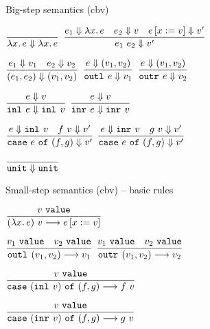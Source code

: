 \documentclass{beamer}
\begin{document}
\begin{frame}{Big-step semantics (cbv)}

\begin{center}
  $\infrule{}{\bigstep{\fun{x}{e}}{\fun{x}{e}}}$ \quad
  $\infrule{\bigstep{e_1}{\fun{x}{e}} \quad \bigstep{e_2}{v} \quad \bigstep{\subst{e}{x}{v}}{v'}}{\bigstep{\app{e_1}{e_2}}{v'}}$

  \vspace{2em}

  $\displaystyle \frac{e_1 \Downarrow v_1 \quad e_2 \Downarrow v_2}{(e_1, e_2) \Downarrow (v_1, v_2)} \textsc{\footnotesize{}}$ \quad
  $\displaystyle \frac{e \Downarrow (v_1, v_2)}{\texttt{outl}_{}\ e \Downarrow v_1} \textsc{\footnotesize{}}$ \quad
  $\displaystyle \frac{e \Downarrow (v_1, v_2)}{\texttt{outr}_{}\ e \Downarrow v_2} \textsc{\footnotesize{}}$ \quad

  \vspace{2em}

  $\displaystyle \frac{e \Downarrow v}{\texttt{inl}_{}\ e \Downarrow \texttt{inl}_{}\ v} \textsc{\footnotesize{}}$ \quad
  $\displaystyle \frac{e \Downarrow v}{\texttt{inr}_{}\ e \Downarrow \texttt{inr}_{}\ v} \textsc{\footnotesize{}}$ \quad

  \vspace{2em}

  $\infrule{\bigstep{e}{\inl{v}} \quad \bigstep{\app{f}{v}}{v'}}{\bigstep{\case{e}{f}{g}}{v'}}$ \quad
  $\infrule{\bigstep{e}{\inr{v}} \quad \bigstep{\app{g}{v}}{v'}}{\bigstep{\case{e}{f}{g}}{v'}}$

  \vspace{2em}

  $\displaystyle \frac{}{\texttt{unit} \Downarrow \texttt{unit}} \textsc{\footnotesize{}}$ \quad
\end{center}

\end{frame}

\begin{frame}{Small-step semantics (cbv) -- basic rules}

\begin{center}
  $\infrule{\val{v}}{\smallstep{\app{(\fun{x}{e})}{v}}{\subst{e}{x}{v}}}$

  \vspace{2em}

  $\displaystyle \frac{v_1\ \texttt{value} \quad v_2\ \texttt{value}}{\texttt{outl}_{}\ (v_1, v_2) \longrightarrow v_1} \textsc{\footnotesize{}}$ \quad
  $\displaystyle \frac{v_1\ \texttt{value} \quad v_2\ \texttt{value}}{\texttt{outr}_{}\ (v_1, v_2) \longrightarrow v_2} \textsc{\footnotesize{}}$

  \vspace{2em}

  $\infrule{\val{v}}{\smallstep{\case{(\inl{v})}{f}{g}}{\app{f}{v}}}$

  \vspace{2em}

  $\infrule{\val{v}}{\smallstep{\case{(\inr{v})}{f}{g}}{\app{g}{v}}}$

\end{center}

\end{frame}
\end{document}
